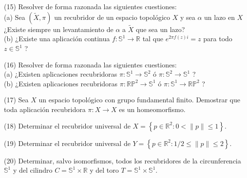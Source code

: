 \documentclass[
  a4paper,
  spanish,
  12pt,
]{scrartcl}
\begin{document}
\begin{ejer}
(15) Resolver de forma razonada las siguientes cuestiones:\\
(a) Sea $(\widetilde{X}, \pi)$ un recubridor de un espacio topológico $X$ y sea $\alpha$ un lazo en $X$ ¿Existe siempre un levantamiento de $\alpha$ a $\widetilde{X}$ que sea un lazo?\\
(b) ¿Existe una aplicación continua $f: \mathbb{S}^{1} \rightarrow \mathbb{R}$ tal que $e^{2 \pi f(z) i}=z$ para todo $z \in \mathbb{S}^{1}$ ?\\
\end{ejer}

\begin{ejer}
(16) Resolver de forma razonada las siguientes cuestiones:\\
(a) ¿Existen aplicaciones recubridoras $\pi: \mathbb{S}^{1} \rightarrow \mathbb{S}^{2}$ ó $\pi: \mathbb{S}^{2} \rightarrow \mathbb{S}^{1}$ ?\\
(b) ¿Existen aplicaciones recubridoras $\pi: \mathbb{R} \mathbb{P}^{2} \rightarrow \mathbb{S}^{1}$ ó $\pi: \mathbb{S}^{1} \rightarrow \mathbb{R} \mathbb{P}^{2}$ ?\\
\end{ejer}

\begin{ejer}
(17) Sea $X$ un espacio topológico con grupo fundamental finito. Demostrar que toda aplicación recubridora $\pi: X \rightarrow X$ es un homeomorfismo.\\
\end{ejer}

\begin{ejer}
(18) Determinar el recubridor universal de $X=\left\{p \in \mathbb{R}^{2}: 0<\|p\| \leq 1\right\}$.\\
\end{ejer}

\begin{ejer}
(19) Determinar el recubridor universal de $Y=\left\{p \in \mathbb{R}^{2}: 1 / 2 \leq\|p\| \leq 2\right\}$.\\
\end{ejer}

\begin{ejer}
(20) Determinar, salvo isomorfismos, todos los recubridores de la circunferencia $\mathbb{S}^{1}$ y del cilindro $C=\mathbb{S}^{1} \times \mathbb{R}$ y del toro $T=\mathbb{S}^{1} \times \mathbb{S}^{1}$.\\
\end{ejer}
\end{document}
